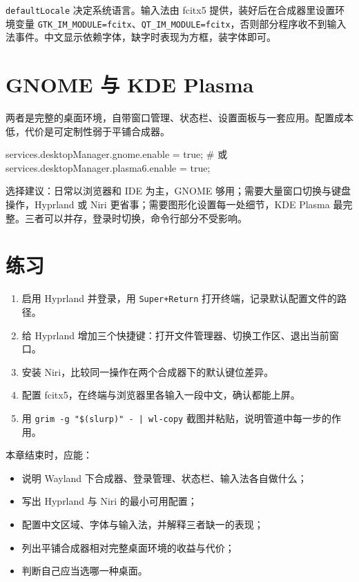 \texttt{defaultLocale} 决定系统语言。输入法由 fcitx5 提供，装好后在合成器里设置环境变量 \texttt{GTK\_IM\_MODULE=fcitx}、\texttt{QT\_IM\_MODULE=fcitx}，否则部分程序收不到输入法事件。中文显示依赖字体，缺字时表现为方框，装字体即可。

\section{GNOME 与 KDE Plasma}

两者是完整的桌面环境，自带窗口管理、状态栏、设置面板与一套应用。配置成本低，代价是可定制性弱于平铺合成器。

\begin{nixcode}
services.desktopManager.gnome.enable = true;
# 或
services.desktopManager.plasma6.enable = true;
\end{nixcode}

选择建议：日常以浏览器和 IDE 为主，GNOME 够用；需要大量窗口切换与键盘操作，Hyprland 或 Niri 更省事；需要图形化设置每一处细节，KDE Plasma 最完整。三者可以并存，登录时切换，命令行部分不受影响。

\section{练习}

\begin{enumerate}
  \item 启用 Hyprland 并登录，用 \texttt{Super+Return} 打开终端，记录默认配置文件的路径。
  \item 给 Hyprland 增加三个快捷键：打开文件管理器、切换工作区、退出当前窗口。
  \item 安装 Niri，比较同一操作在两个合成器下的默认键位差异。
  \item 配置 fcitx5，在终端与浏览器里各输入一段中文，确认都能上屏。
  \item 用 \texttt{grim -g "\$(slurp)" - | wl-copy} 截图并粘贴，说明管道中每一步的作用。
\end{enumerate}

\begin{checkpoint}
本章结束时，应能：
\begin{itemize}
  \item 说明 Wayland 下合成器、登录管理、状态栏、输入法各自做什么；
  \item 写出 Hyprland 与 Niri 的最小可用配置；
  \item 配置中文区域、字体与输入法，并解释三者缺一的表现；
  \item 列出平铺合成器相对完整桌面环境的收益与代价；
  \item 判断自己应当选哪一种桌面。
\end{itemize}
\end{checkpoint}
